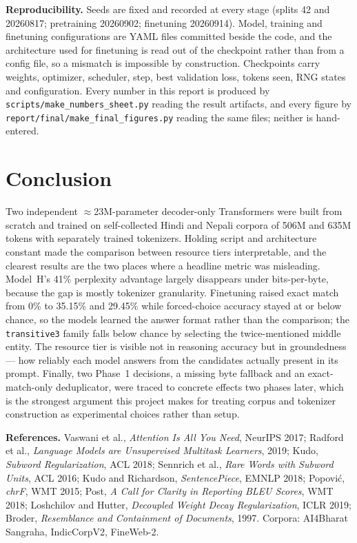 \documentclass[10pt]{article}
\begin{document}
\textbf{Reproducibility.} Seeds are fixed and recorded at every stage (splits 42 and
20260817; pretraining 20260902; finetuning 20260914). Model, training and finetuning
configurations are YAML files committed beside the code, and the architecture used for
finetuning is read out of the checkpoint rather than from a config file, so a mismatch
is impossible by construction. Checkpoints carry weights, optimizer, scheduler, step,
best validation loss, tokens seen, RNG states and configuration. Every number in this
report is produced by \texttt{scripts/make\_numbers\_sheet.py} reading the result
artifacts, and every figure by \texttt{report/final/make\_final\_figures.py} reading
the same files; neither is hand-entered.

\section{Conclusion}

Two independent $\approx$23M-parameter decoder-only Transformers were built from
scratch and trained on self-collected Hindi and Nepali corpora of 506M and 635M
tokens with separately trained tokenizers. Holding script and architecture constant
made the comparison between resource tiers interpretable, and the clearest results
are the two places where a headline metric was misleading. Model~H's 41\% perplexity
advantage largely disappears under bits-per-byte, because the gap is mostly tokenizer
granularity. Finetuning raised exact match from 0\% to 35.15\% and 29.45\% while
forced-choice accuracy stayed at or below chance, so the models learned the answer
format rather than the comparison; the \texttt{transitive3} family falls below chance
by selecting the twice-mentioned middle entity. The resource tier is visible not in
reasoning accuracy but in groundedness --- how reliably each model answers from the
candidates actually present in its prompt. Finally, two Phase~1 decisions, a missing
byte fallback and an exact-match-only deduplicator, were traced to concrete effects
two phases later, which is the strongest argument this project makes for treating
corpus and tokenizer construction as experimental choices rather than setup.

\vspace{3pt}
\footnotesize
\noindent\textbf{References.}
Vaswani et al., \emph{Attention Is All You Need}, NeurIPS 2017;
Radford et al., \emph{Language Models are Unsupervised Multitask Learners}, 2019;
Kudo, \emph{Subword Regularization}, ACL 2018; Sennrich et al., \emph{Rare Words with
Subword Units}, ACL 2016; Kudo and Richardson, \emph{SentencePiece}, EMNLP 2018;
Popovi\'{c}, \emph{chrF}, WMT 2015; Post, \emph{A Call for Clarity in Reporting BLEU
Scores}, WMT 2018; Loshchilov and Hutter, \emph{Decoupled Weight Decay
Regularization}, ICLR 2019; Broder, \emph{Resemblance and Containment of Documents},
1997. Corpora: AI4Bharat Sangraha, IndicCorpV2, FineWeb-2.
\end{document}
